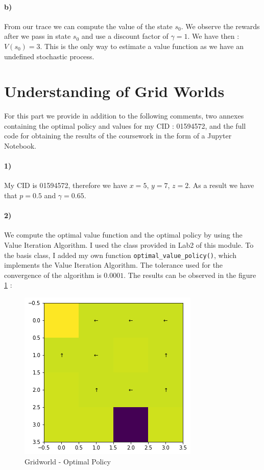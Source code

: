 \documentclass[11pt,a4paper]{article}
\numberwithin{equation}{section}
\begin{document}
\paragraph{b)}

From our trace we can compute the value of the state $s_0$. We observe the rewards after we pass in state $s_0$ and use a discount factor of $\gamma = 1$. We have then : $V(s_0) = 3 $. This is the only way to estimate a value function as we have an undefined stochastic process.

\section{Understanding of Grid Worlds}

For this part we provide in addition to the following comments, two annexes containing the optimal policy and values for my CID : 01594572, and the full code for obtaining the results of the coursework in the form of a Jupyter Notebook. 

\paragraph{1)}
My CID is 01594572, therefore we have $x=5$, $y=7$, $z=2$. As a result we have that $p=0.5$ and $\gamma=0.65$.
\paragraph{2)} We compute the optimal value function and the optimal policy by using the Value Iteration Algorithm. I used the class provided in Lab2 of this module. To the basis class, I added my own function  \texttt{optimal\_value\_policy()}, which implements the Value Iteration Algorithm. The tolerance used for the convergence of the algorithm is $0.0001$. The results can be observed in the  figure \ref{optGrid} :

\begin{figure}[H]
	\centering
	\includegraphics[width = 0.5\linewidth]{grid_optimal}
	\caption{Gridworld - Optimal Policy}
	\label{optGrid}
\end{figure}
\end{document}

